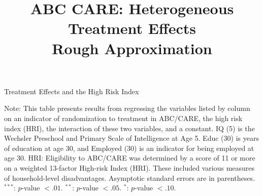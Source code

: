 





\title{\Large \textbf{ABC CARE: Heterogeneous Treatment Effects \\ Rough Approximation}}
\maketitle

\begin{sidewaystable}[H] 
\begin{threeparttable}
\caption{Treatment Effects and the High Risk Index}
\centering 
\scriptsize

\begin{tablenotes}
\footnotesize
\item Note: This table presents results from regressing the variables listed by column on an indicator of randomization to treatment in ABC/CARE, the high risk index (HRI), the interaction of these two variables, and a constant. IQ (5) is the Wechsler Preschool and Primary Scale of Intelligence at Age 5. Educ (30) is years of education at age 30, and Employed (30) is an indicator for being employed at age 30. HRI: Eligibility to ABC/CARE was determined by a score of 11 or more on a weighted 13-factor High-risk Index (HRI). These included various measures of household-level disadvantages. Asymptotic standard errors are in parentheses. $^{***}$: $p$-value $< .01$. $^{**}$: $p$-value $< .05$. $^{*}$: $p$-value $< .10$. 
\end{tablenotes}
\end{threeparttable}
\end{sidewaystable}


 
